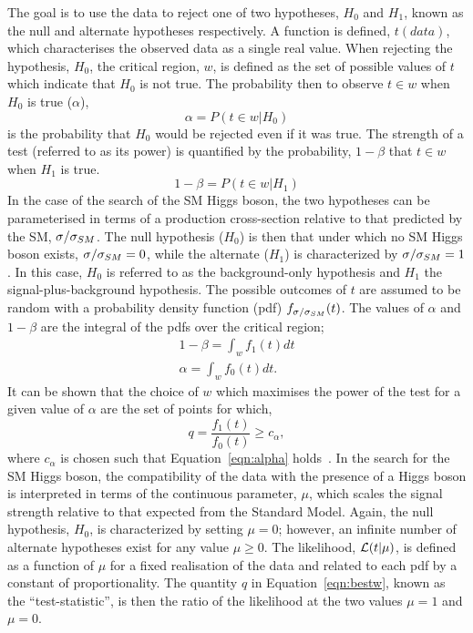 The goal is to use the data 
to reject one of two hypotheses,
$H_{0}$ and $H_{1}$, known as the null and alternate hypotheses
respectively. A function is defined, $t(data)$,
which characterises the observed data as a single real value. When rejecting 
the hypothesis, $H_{0}$, the critical
region, $w$, is defined as the set of possible values of $t$
which indicate that $H_{0}$ is not true. The probability then 
to observe $t\in w$ when $H_{0}$ is true ($\alpha$), 
\begin{equation}
\alpha = P(t\in w|H_{0})
\end{equation}
is the probability that $H_{0}$ would be rejected even if it was true.
The strength of a test (referred to as its power) is quantified by 
the probability, $1-\beta$ that $t \in  w$ when $H_{1}$ is true.
\begin{equation}
1-\beta = P(t\in w|H_{1})
\end{equation}
In the case of the search of the SM Higgs boson, the two hypotheses
can be parameterised in terms of a production cross-section relative
to that predicted by the SM, $\sigma/\sigma_{SM}$.  
The null hypothesis ($H_{0}$) is then that under which no SM Higgs boson exists,
$\sigma/\sigma_{SM}=0$, while the alternate ($H_{1}$) is characterized by $\sigma/\sigma_{SM}=1$.
In this case, $H_{0}$ is referred to as the background-only hypothesis
and $H_{1}$ the signal-plus-background hypothesis.
The possible outcomes of $t$ are assumed to be random with a probability density
function (pdf) $f_{\sigma/\sigma_{SM}}(t)$. The values of $\alpha$ and $1-\beta$ are the integral of the pdfs
over the critical region;
\begin{eqnarray}
1-\beta =  \int_{w}f_{1}(t)dt\\ 
\alpha =  \int_{w}f_{0}(t)dt.
\label{eqn:alpha}
\end{eqnarray}
It can be shown that the choice of $w$ which maximises the power of the test for 
a given value of $\alpha$ are the set of points for which,
\begin{equation} 
	q = \frac {\displaystyle f_{1}(t)}{\displaystyle f_{0}(t)} \ge c_{\alpha},
\label{eqn:bestw}
\end{equation}
where $c_{\alpha}$ is chosen such that Equation~\ref{eqn:alpha} holds~\citep{statsbook}.
In the search for the SM Higgs boson, the compatibility of the data
with the presence of a Higgs boson is interpreted in terms of the 
continuous parameter, $\mu$, which scales the signal strength relative to that expected
from the Standard Model. 
Again, the null hypothesis, $H_{0}$, is characterized by setting $\mu=0$; however,
an infinite number of alternate hypotheses exist for any value $\mu \ge 0$.
The likelihood, $\mathcal{L}(t|\mu)$, is defined as a function of $\mu$ for a fixed 
realisation of the data and related to each pdf by a constant of proportionality.
The quantity $q$ in Equation~\ref{eqn:bestw}, known as the ``test-statistic'', is then
the ratio of the likelihood at the two values $\mu=1$ and $\mu=0$. 

